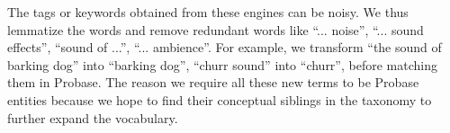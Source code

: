 The tags or keywords obtained from these engines can be noisy. We thus
lemmatize the words and remove redundant words like ``... noise'',
``... sound effects'', ``sound of ...'', ``... ambience''. For example,
we transform ``the sound of barking dog'' into ``barking dog'',
``churr sound'' into ``churr'', before matching them in Probase. The reason
we require all these new terms to be Probase entities because we hope to find
their conceptual siblings in the taxonomy to further expand the vocabulary.

%

